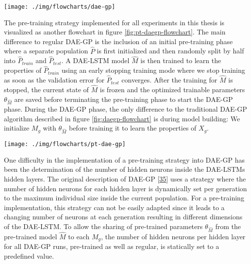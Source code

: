 \documentclass[
  11pt,
]{article}
\let\origfigure\figure
\let\endorigfigure\endfigure
\renewenvironment{figure}[1][2] {
    \expandafter\origfigure\expandafter[H]
} {
    \endorigfigure
}
\begin{document}
\begin{figure}[c]

{\centering \texttt{[image: ./img/flowcharts/dae-gp]} 

}

\caption{Regular DAE-GP Flowchart}\label{fig:daegp-flowchart}
\end{figure}

The pre-training strategy implemented for all experiments in this thesis is visualized as another flowchart in figure \ref{fig:pt-daegp-flowchart}.
The main difference to regular DAE-GP is the inclusion of an initial pre-training phase where a separate population \(\hat{P}\) is first initialized and then randomly split by half into \(\hat{P}_{train}\) and \(\hat{P}_{test}\).
A DAE-LSTM model \(\hat{M}\) is then trained to learn the properties of \(\hat{P}_{train}\) using an early stopping training mode where we stop training as soon as the validation error for \(\hat{P}_{test}\) converges.
After the training for \(\hat{M}\) is stopped, the current state of \(\hat{M}\) is frozen and the optimized trainable parameters \(\theta_{\hat{M}}\) are saved before terminating the pre-training phase to start the DAE-GP phase.
During the DAE-GP phase, the only difference to the traditional DAE-GP algorithm described in figure \ref{fig:daegp-flowchart} is during model building: We initialize \(M_g\) with \(\theta_{\hat{M}}\) before training it to learn the properties of \(X_g\).

\begin{figure}[c]

{\centering \texttt{[image: ./img/flowcharts/pt-dae-gp]} 

}

\caption{Pre-Trained DAE-GP Flowchart}\label{fig:pt-daegp-flowchart}
\end{figure}

One difficulty in the implementation of a pre-training strategy into DAE-GP has been the determination of the number of hidden neurons inside the DAE-LSTMs hidden layers.
The original description of DAE-GP {[}\protect\hyperlink{ref-dae-gp_2020_rtree}{35}{]} uses a strategy where the number of hidden neurons for each hidden layer is dynamically set per generation to the maximum individual size inside the current population.
For a pre-training implementation, this strategy can not be easily adapted since it leads to a changing number of neurons at each generation resulting in different dimensions of the DAE-LSTM.
To allow the sharing of pre-trained parameters \(\theta_{\hat{M}}\) from the pre-trained model \(\hat{M}\) to each \(M_g\), the number of hidden neurons per hidden layer for all DAE-GP runs, pre-trained as well as regular, is statically set to a predefined value.
\end{document}
